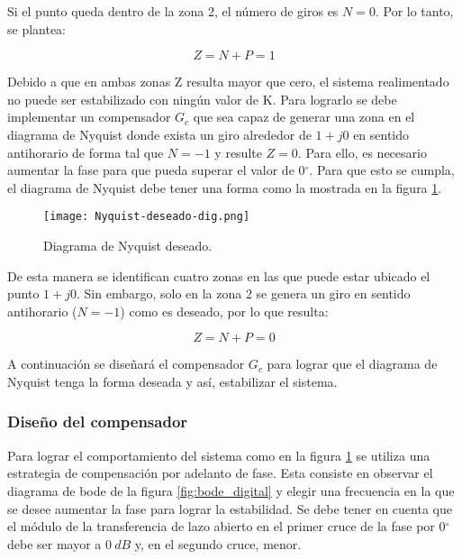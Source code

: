 Si el punto queda dentro de la zona 2, el número de giros es $N=0$. Por lo tanto, se plantea:

\begin{equation*}
	Z = N + P = 1
\end{equation*}

Debido a que en ambas zonas Z resulta mayor que cero, el sistema realimentado no puede ser estabilizado con ningún valor de K. Para lograrlo se debe implementar un compensador $G_c$ que sea capaz de generar una zona en el diagrama de Nyquist donde exista un giro alrededor de $1 + j0$ en sentido antihorario de forma tal que $N=-1$ y resulte $Z=0$. Para ello, es necesario aumentar la fase para que pueda superar el valor de 0$\mathrm{{}^\circ}$. Para que esto se cumpla, el diagrama de Nyquist debe tener una forma como la  mostrada en la figura \ref{fig:nyquist-deseado-dig}.

\begin{figure}[H]
	\centering
	\texttt{[image: Nyquist-deseado-dig.png]}
	\caption{Diagrama de Nyquist deseado.}
	\label{fig:nyquist-deseado-dig}
\end{figure}

De esta manera se identifican cuatro zonas en las que puede estar ubicado el punto $1+j0$. Sin embargo, solo en la zona 2 se genera un giro en sentido antihorario ($N=-1$) como es deseado, por lo que resulta:

\begin{equation*}
	Z = N + P = 0
\end{equation*}


A continuación se diseñará el compensador $G_c$ para lograr que el diagrama de Nyquist tenga la forma deseada y así, estabilizar el sistema.

\subsubsection{Diseño del compensador}

Para lograr el comportamiento del sistema como en la figura 	\ref{fig:nyquist-deseado-dig} se utiliza una estrategia de compensación por adelanto de fase. Esta consiste en observar el diagrama de bode de la figura \ref{fig:bode_digital} y elegir una frecuencia en la que se desee aumentar la fase para lograr la estabilidad. Se debe tener en cuenta que el módulo de la transferencia de lazo abierto en el primer cruce de la fase por 0$\mathrm{{}^\circ}$ debe ser mayor a $0\:dB$ y, en el segundo cruce, menor. 

